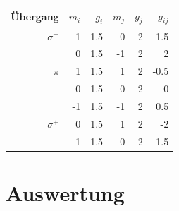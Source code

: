 \documentclass[captions=tableheading]{scrartcl}
\begin{document}
\begin{table}[H]
	\centering
	\label{tab:landeblau}
	\begin{tabular}{r r r r r r}
		\toprule
		Übergang & $m_i$ & $g_i$ & $m_j$ & $g_j$ & $g_{ij}$ \\
		\midrule
		$\sigma^-$ & 1 & 1.5 & 0 & 2 & 1.5 \\
			   	   & 0 & 1.5 & -1 & 2 & 2 \\
		$\pi$	   & 1 & 1.5 & 1 & 2 & -0.5 \\
				   & 0 & 1.5 & 0 & 2 & 0 \\
				   & -1 & 1.5 & -1 & 2 & 0.5 \\
		$\sigma^+$ & 0 & 1.5 & 1 & 2 & -2 \\
				   & -1 & 1.5 & 0 & 2 & -1.5 \\
		\bottomrule	
	\end{tabular}
\end{table}

\section{Auswertung}
\end{document}
